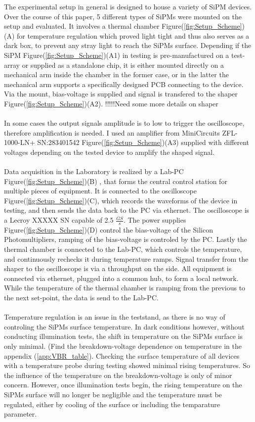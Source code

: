 \documentclass[12pt,article,type=msc,colorback,accentcolor=tud9c]{tudthesis}
\begin{document}
The experimental setup in general is designed to house a variety of SiPM devices. Over the course of this paper, 5 different types of SiPMs were mounted on the setup and evaluated. It involves a thermal chamber Figure(\ref{fig:Setup_Scheme})(A) for temperature regulation which proved light tight and thus also serves as a dark box, to prevent any stray light to reach the SiPMs surface. Depending if the SiPM Figure(\ref{fig:Setup_Scheme})(A1) in testing is pre-manufactured on a test-array or supplied as a standalone chip, it is either mounted directly on a mechanical arm inside the chamber in the former case, or in the latter the mechanical arm supports a specifically designed PCB connecting to the device. Via the mount, bias-voltage is supplied and signal is transfered to the shaper Figure(\ref{fig:Setup_Scheme})(A2). !!!!!Need some more details on shaper\\\\
In some cases the output signals amplitude is to low to trigger the oscilloscope, therefore amplification is needed. I used an amplifier from MiniCircuits ZFL-1000-LN+ SN:283401542  Figure(\ref{fig:Setup_Scheme})(A3) supplied with different voltages depending on the tested device to amplify the shaped signal.\\\\
Data acquisition in the Laboratory is realized by a Lab-PC Figure(\ref{fig:Setup_Scheme})(B) , that forms the central control station for multiple pieces of equipment. It is connected to the oscilloscope Figure(\ref{fig:Setup_Scheme})(C), which records the waveforms of the device in testing, and then sends the data back to the PC via ethernet. The oscilloscope is a Lecroy XXXXX SN capable of 2.5 $\frac{GS}{s}$. The power supplies Figure(\ref{fig:Setup_Scheme})(D) control the bias-voltage of the Silicon Photomultipliers, ramping of the bias-voltage is controled by the PC. Lastly the thermal chamber is connected to the Lab-PC, which controls the temperature, and continuously rechecks it during temperature ramps. Signal transfer from the shaper to the oscilloscope is via a throughput on the side. All equipment is connected via ethernet, plugged into a common hub, to form a local network. While the temperature of the thermal chamber is ramping from the previous to the next set-point, the data is send to the Lab-PC.\\\\

Temperature regulation is an issue in the teststand, as there is no way of controling the SiPMs surface temperature. In dark conditions however, without conducting illumination tests, the shift in temperature on the SiPMs surface is only minimal. (Find the breakdown-voltage dependence on temperature in the appendix (\ref{app:VBR_table}). Checking the surface temperature of all devices with a temperature probe during testing showed minimal rising temperatures. So the influence of the temperature on the breakdown-voltage is only of minor concern. However, once illumination tests begin, the rising temperature on the SiPMs surface will no longer be negligible and the temperature must be regulated, either by cooling of the surface or including the temparature parameter.
\end{document}
